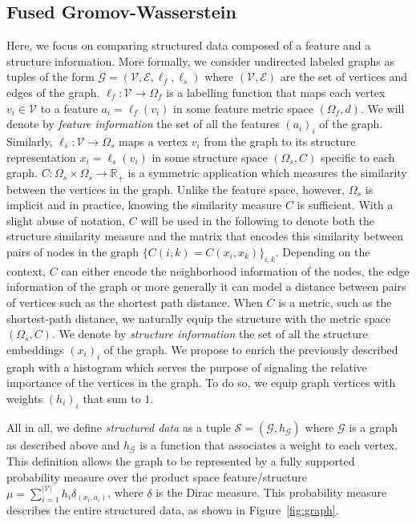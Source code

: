 
\subsection{Fused Gromov-Wasserstein}

Here, we focus on comparing structured data composed of a feature
and a structure information.
More formally, we consider undirected labeled graphs as tuples of the form $\mathcal{G}=(\mathcal{V},\mathcal{E},\ell_f,\ell_s)$ where
$(\mathcal{V},\mathcal{E})$ are the set of vertices and edges of the graph.
$\ell_f: \mathcal{V} \rightarrow \Omega_f$ is a labelling function that
maps each vertex $v_{i} \in \mathcal{V}$ to a feature
$a_{i} = \ell_f(v_{i})$ in some feature metric space
$(\Omega_f,d)$.
We will denote by \emph{feature information} the set of all the features
$(a_{i})_{i}$ of the graph.
Similarly, $\ell_s: \mathcal{V} \rightarrow \Omega_s$ maps a vertex $v_i$ from
the graph to its structure representation
$x_{i} = \ell_s(v_{i})$ in some structure space
$(\Omega_s,C)$ specific to each graph.
$C : \Omega_s \times \Omega_s \rightarrow \mathbb{R_{+}}$ is a symmetric
application which measures the similarity between the vertices in the
graph.
Unlike the feature space, however, $\Omega_s$ is implicit and in practice,
knowing the similarity measure $C$ is sufficient. With a slight abuse of
notation, $C$ will be used in the following to denote both the structure
similarity measure and the matrix that encodes this similarity between pairs of
nodes in the graph $\{C(i,k) = C(x_i, x_k)\}_{i,k}$.
Depending on the context, $C$ can either encode the neighborhood information of
the nodes, the edge information of the graph or more generally it can model a
distance between pairs of vertices such as the shortest path distance.
When $C$ is a metric, such as the shortest-path
distance, we naturally equip the structure with the metric space $(\Omega_s,C)$.
We denote by \emph{structure information} the set of all the structure
embeddings $(x_{i})_i$ of the graph.
We propose to enrich the previously described graph with a histogram which
serves the purpose of signaling the relative importance of the vertices in the
graph.
To do so, we equip graph vertices with weights $(h_{i})_{i}$ that sum to $1$.

All in all, we define \emph{structured data} as a
tuple $\mathcal{S}=(\mathcal{G},h_{\mathcal{G}})$ where $\mathcal{G}$ is a
graph as described above and $h_{\mathcal{G}}$ is a function that
associates a weight to each vertex. This definition allows the graph to be
represented by a fully supported probability measure over the product space
feature/structure $\mu= \sum_{i=1}^{|\mathcal{V}|} h_{i} \delta_{(x_{i},a_{i})}$, where
$\delta$ is the Dirac measure.
This probability measure
describes the entire structured data, as shown in Figure~\ref{fig:graph}.

